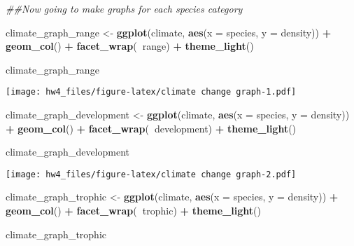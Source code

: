 \documentclass[]{article}
\newenvironment{Shaded}{\begin{snugshade}}{\end{snugshade}}
\newcommand{\CommentTok}[1]{\textcolor[rgb]{0.56,0.35,0.01}{\textit{#1}}}
\newcommand{\DataTypeTok}[1]{\textcolor[rgb]{0.13,0.29,0.53}{#1}}
\newcommand{\KeywordTok}[1]{\textcolor[rgb]{0.13,0.29,0.53}{\textbf{#1}}}
\newcommand{\NormalTok}[1]{#1}
\newcommand{\OperatorTok}[1]{\textcolor[rgb]{0.81,0.36,0.00}{\textbf{#1}}}
\newcommand{\StringTok}[1]{\textcolor[rgb]{0.31,0.60,0.02}{#1}}
\begin{document}
\begin{Shaded}
\begin{Highlighting}[]
\CommentTok{##Now going to make graphs for each species category}

\NormalTok{climate_graph_range <-}\StringTok{ }\KeywordTok{ggplot}\NormalTok{(climate, }\KeywordTok{aes}\NormalTok{(}\DataTypeTok{x =}\NormalTok{ species, }\DataTypeTok{y =}\NormalTok{ density)) }\OperatorTok{+}
\StringTok{  }\KeywordTok{geom_col}\NormalTok{() }\OperatorTok{+}\StringTok{ }
\StringTok{  }\KeywordTok{facet_wrap}\NormalTok{(}\OperatorTok{~}\NormalTok{range) }\OperatorTok{+}
\StringTok{  }\KeywordTok{theme_light}\NormalTok{()}

\NormalTok{climate_graph_range}
\end{Highlighting}
\end{Shaded}

\texttt{[image: hw4\_files/figure-latex/climate change graph-1.pdf]}

\begin{Shaded}
\begin{Highlighting}[]
\NormalTok{climate_graph_development <-}\StringTok{ }\KeywordTok{ggplot}\NormalTok{(climate, }\KeywordTok{aes}\NormalTok{(}\DataTypeTok{x =}\NormalTok{ species, }\DataTypeTok{y =}\NormalTok{ density)) }\OperatorTok{+}
\StringTok{  }\KeywordTok{geom_col}\NormalTok{() }\OperatorTok{+}\StringTok{ }
\StringTok{  }\KeywordTok{facet_wrap}\NormalTok{(}\OperatorTok{~}\NormalTok{development) }\OperatorTok{+}
\StringTok{  }\KeywordTok{theme_light}\NormalTok{()}

\NormalTok{climate_graph_development}
\end{Highlighting}
\end{Shaded}

\texttt{[image: hw4\_files/figure-latex/climate change graph-2.pdf]}

\begin{Shaded}
\begin{Highlighting}[]
\NormalTok{climate_graph_trophic <-}\StringTok{ }\KeywordTok{ggplot}\NormalTok{(climate, }\KeywordTok{aes}\NormalTok{(}\DataTypeTok{x =}\NormalTok{ species, }\DataTypeTok{y =}\NormalTok{ density)) }\OperatorTok{+}
\StringTok{  }\KeywordTok{geom_col}\NormalTok{() }\OperatorTok{+}\StringTok{ }
\StringTok{  }\KeywordTok{facet_wrap}\NormalTok{(}\OperatorTok{~}\NormalTok{trophic) }\OperatorTok{+}
\StringTok{  }\KeywordTok{theme_light}\NormalTok{()}

\NormalTok{climate_graph_trophic}
\end{Highlighting}
\end{Shaded}
\end{document}

